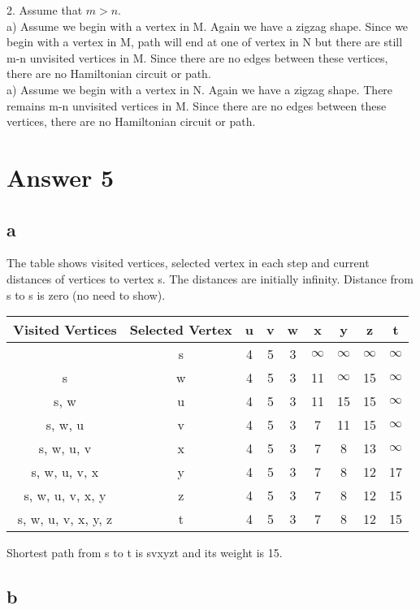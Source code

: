 \documentclass[11pt]{article}
\begin{document}
2. Assume that $m>n$.\\
a) Assume we begin with a vertex in M. Again we have a zigzag shape. Since we begin with a vertex in M, path will end at one of vertex in N but there are still m-n unvisited vertices in M. Since there are no edges between these vertices, there are no Hamiltonian circuit or path.\\
a) Assume we begin with a vertex in N. Again we have a zigzag shape. There remains m-n unvisited vertices in M. Since there are no edges between these vertices, there are no Hamiltonian circuit or path.\\

\section*{Answer 5}
\subsection*{a}
The table shows visited vertices, selected vertex in each step and current distances of vertices to vertex s. The distances are initially infinity. Distance from s to s is zero (no need to show).
\begin{table}[H]
\small
\centering
\begin{tabular}
{|c|c|c|c|c|c|c|c|c|}	%
\hline
Visited Vertices & Selected Vertex & u & v & w & x & y & z & t \\
\hline
  & s & 4 & 5 & 3 & $\infty$ & $\infty$ & $\infty$ & $\infty$ \\
  \hline
 s & w & 4 & 5 & 3 & 11 & $\infty$ & 15 & $\infty$ \\
 \hline
 s, w & u & 4 & 5 & 3 & 11 & 15 & 15 & $\infty$ \\
 \hline
 s, w, u & v & 4 & 5 & 3 & 7 & 11 & 15 & $\infty$ \\
 \hline
 s, w, u, v & x & 4 & 5 & 3 & 7 & 8 & 13 & $\infty$ \\
 \hline
 s, w, u, v, x & y & 4 & 5 & 3 & 7 & 8 & 12 & 17 \\
 \hline
 s, w, u, v, x, y & z & 4 & 5 & 3 & 7 & 8 & 12 & 15 \\
 \hline
 s, w, u, v, x, y, z & t & 4 & 5 & 3 & 7 & 8 & 12 & 15 \\
\hline

\end{tabular}
\end{table}
Shortest path from s to t is svxyzt and its weight is 15.
\subsection*{b}
\end{document}
